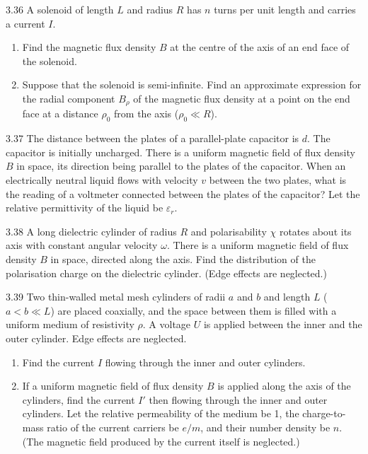 \begin{problem}{3.36}
A solenoid of length $L$ and radius $R$ has $n$ turns per unit length and carries a current $I$.
\begin{enumerate}[label=(\arabic*),leftmargin=2.2em,itemsep=1pt,topsep=2pt]
\item Find the magnetic flux density $B$ at the centre of the axis of an end face of the solenoid.
\item Suppose that the solenoid is semi-infinite. Find an approximate expression for the radial component $B_\rho$ of the magnetic flux density at a point on the end face at a distance $\rho_0$ from the axis ($\rho_0\ll R$).
\end{enumerate}
\end{problem}

\begin{problem}{3.37}
The distance between the plates of a parallel-plate capacitor is $d$. The capacitor is initially uncharged. There is a uniform magnetic field of flux density $B$ in space, its direction being parallel to the plates of the capacitor. When an electrically neutral liquid flows with velocity $v$ between the two plates, what is the reading of a voltmeter connected between the plates of the capacitor? Let the relative permittivity of the liquid be $\varepsilon_r$.
\end{problem}

\begin{problem}{3.38}
A long dielectric cylinder of radius $R$ and polarisability $\chi$ rotates about its axis with constant angular velocity $\omega$. There is a uniform magnetic field of flux density $B$ in space, directed along the axis. Find the distribution of the polarisation charge on the dielectric cylinder. (Edge effects are neglected.)
\end{problem}

\begin{problem}{3.39}
Two thin-walled metal mesh cylinders of radii $a$ and $b$ and length $L$ ($a<b\ll L$) are placed coaxially, and the space between them is filled with a uniform medium of resistivity $\rho$. A voltage $U$ is applied between the inner and the outer cylinder. Edge effects are neglected.
\begin{enumerate}[label=(\arabic*),leftmargin=2.2em,itemsep=1pt,topsep=2pt]
\item Find the current $I$ flowing through the inner and outer cylinders.
\item If a uniform magnetic field of flux density $B$ is applied along the axis of the cylinders, find the current $I'$ then flowing through the inner and outer cylinders. Let the relative permeability of the medium be 1, the charge-to-mass ratio of the current carriers be $e/m$, and their number density be $n$. (The magnetic field produced by the current itself is neglected.)
\end{enumerate}
\end{problem}

